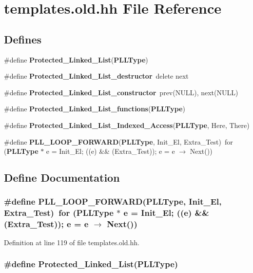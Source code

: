 \section{templates.old.hh File Reference}
\label{templates_8old_8hh}
\subsection*{Defines}
\begin{CompactItemize}
\item 
\#define {\bf Protected\_\-Linked\_\-List}({\bf PLLType})
\item 
\#define {\bf Protected\_\-Linked\_\-List\_\-destructor}\ delete next
\item 
\#define {\bf Protected\_\-Linked\_\-List\_\-constructor}\ prev(NULL), next(NULL)
\item 
\#define {\bf Protected\_\-Linked\_\-List\_\-functions}({\bf PLLType})
\item 
\#define {\bf Protected\_\-Linked\_\-List\_\-Indexed\_\-Access}({\bf PLLType}, Here, There)
\item 
\#define {\bf PLL\_\-LOOP\_\-FORWARD}({\bf PLLType}, Init\_\-El, Extra\_\-Test)\ for ({\bf PLLType} $\ast$ e = Init\_\-El; ((e) \&\& (Extra\_\-Test)); e = e $\rightarrow$ Next())
\end{CompactItemize}


\subsection{Define Documentation}
\subsubsection{\setlength{\rightskip}{0pt plus 5cm}\#define PLL\_\-LOOP\_\-FORWARD({\bf PLLType}, Init\_\-El, Extra\_\-Test)\ for ({\bf PLLType} $\ast$ e = Init\_\-El; ((e) \&\& (Extra\_\-Test)); e = e $\rightarrow$ Next())}\label{templates_8old_8hh_a5}




Definition at line 119 of file templates.old.hh.
\subsubsection{\setlength{\rightskip}{0pt plus 5cm}\#define Protected\_\-Linked\_\-List({\bf PLLType})}\label{templates_8old_8hh_a0}


